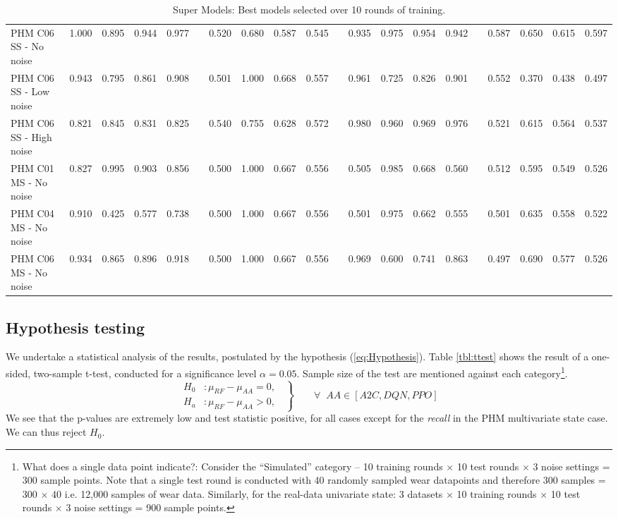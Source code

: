 \documentclass[a4paper, 12pt]{article}
\begin{document}
\begin{landscape}
\begin{table}
\begin{tabular}{@{}l rrrr c rrrr c rrrr c rrrr@{}}
			PHM C06 SS - No noise &1.000 &0.895 &0.944 & 0.977 & & 0.520 &0.680 &0.587 &0.545 & &0.935 &0.975 &0.954 &0.942 & &0.587 &0.650 &0.615&0.597\\
			PHM C06 SS - Low noise &0.943 &0.795 &0.861 & 0.908 & & 0.501 &1.000 &0.668 &0.557 & &0.961 &0.725 &0.826 &0.901 & &0.552 &0.370 &0.438&0.497\\
			PHM C06 SS - High noise &0.821 &0.845 &0.831 & 0.825 & & 0.540 &0.755 &0.628 &0.572 & &0.980 &0.960 &0.969 &0.976 & &0.521 &0.615 &0.564&0.537\\\midrule
			
			PHM C01 MS - No noise &0.827 &0.995 &0.903 & 0.856 & & 0.500 &1.000 &0.667 &0.556 & &0.505 &0.985 &0.668 &0.560 & &0.512 &0.595 &0.549&0.526\\
			PHM C04 MS - No noise &0.910 &0.425 &0.577 & 0.738 & & 0.500 &1.000 &0.667 &0.556 & &0.501 &0.975 &0.662 &0.555 & &0.501 &0.635 &0.558&0.522\\
			PHM C06 MS - No noise &0.934 &0.865 &0.896 & 0.918 & & 0.500 &1.000 &0.667 &0.556 & &0.969 &0.600 &0.741 &0.863 & &0.497 &0.690 &0.577&0.526\\			
			\bottomrule
		\end{tabular}
		\caption{Super Models: Best models selected over 10 rounds of training.}
		\label{tbl:SuperModels}
	\end{table}
\end{landscape}
\restoregeometry 
{}


\subsection{Hypothesis testing}
We undertake a statistical analysis of the results, postulated by the hypothesis (\ref{eq:Hypothesis}). Table \ref{tbl:ttest} shows the result of a one-sided, two-sample t-test, conducted for a significance level $\alpha=0.05$. Sample size of the test are mentioned against each category\footnote{What does a single data point indicate?: Consider the ``Simulated'' category -- 10 training rounds $\times$ 10 test rounds $\times$ 3 noise settings = 300 sample points. Note that a single test round is conducted with 40 randomly sampled wear datapoints and therefore 300 samples = 300 $\times$ 40 i.e. 12,000 samples of wear data. Similarly, for the real-data univariate state: 3 datasets $\times$ 10 training rounds $\times$ 10 test rounds $\times$ 3 noise settings = 900 sample points.}.
\begin{equation}
	\left.\begin{aligned}
		H_0 & : \mu_{RF} - \mu_{AA} = 0,\;\; \\
		H_a & : \mu_{RF} - \mu_{AA} > 0, \;\;
	\end{aligned}
	\right\}
	\qquad \forall \;\; \text{$AA \in[A2C, DQN, PPO]$}
	\label{eq:Hypothesis}
\end{equation}
We see that the p-values are extremely low and test statistic positive, for all cases except for the \textit{recall} in the PHM multivariate state case. We can thus reject $H_0$.
\end{document}
